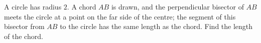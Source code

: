 A circle has radius $2$. A chord $AB$ is drawn, and the perpendicular bisector of $AB$ meets the circle at a point on the far side of the centre; the segment of this bisector from $AB$ to the circle has the same length as the chord. Find the length of the chord.
